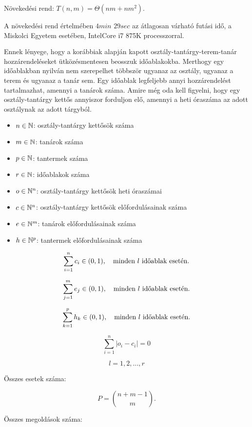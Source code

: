 Növekedési rend: $T(n,m)=\Theta (nm+nm^2).$

A növekedési rend értelmében $4min$ $29sec$ az átlagosan várható futási idő, a Miskolci Egyetem esetében, IntelCore i7 875K processzorral. 


Ennek lényege, hogy a korábbiak alapján kapott osztály-tantárgy-terem-tanár
hozzárendeléseket ütközésmentesen beosszuk időablakokba. Merthogy egy időablakban nyilván nem szerepelhet többször ugyanaz az osztály, ugyanaz a terem és ugyanaz a tanár sem. Egy időablak legfeljebb annyi hozzárendelést tartalmazhat, amennyi a tanárok száma. Amire még oda kell figyelni, hogy egy osztály-tantárgy kettős annyiszor forduljon elő, amennyi a heti óraszáma az adott osztálynak az adott tárgyból.


\begin{itemize}
	\item $n \in \Bbb{N}$: osztály-tantárgy kettősök száma
	\item $m \in \Bbb{N}$: tanárok száma
	\item $p \in \Bbb{N}$: tantermek száma
	\item $r \in \Bbb{N}$: időablakok száma
	\item $o \in \Bbb{N}^n$: osztály-tantárgy kettősök heti óraszámai
	\item $c \in \Bbb{N}^n$: osztály-tantárgy kettősök előfordulásainak száma
	\item $e \in \Bbb{N}^m$: tanárok előfordulásainak száma
	\item $h \in \Bbb{N}^p$: tantermek előfordulásainak száma
\end{itemize}

$$\sum_{i=1}^n c_i \in (0,1), \quad \hbox{minden }l\hbox{ időablak esetén.}$$

$$\sum_{j=1}^m e_j \in (0,1), \quad \hbox{minden }l\hbox{ időablak esetén.}$$

$$\sum_{k=1}^p h_k \in (0,1), \quad \hbox{minden }l\hbox{ időablak esetén.}$$

$$\sum_{i=1}^n \vert o_i - c_i \vert = 0$$

$$l=1, 2, \ldots, r$$


Összes esetek száma:

$$P=\binom{n+m-1}{m}.$$

Összes megoldások száma:

